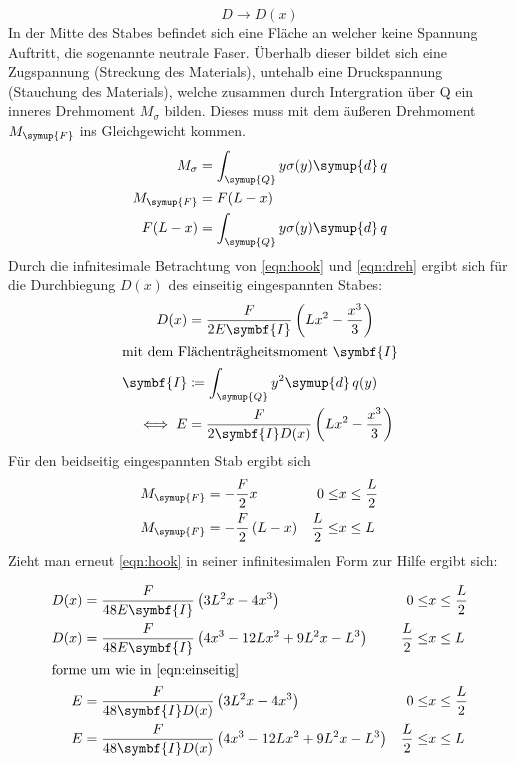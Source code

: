\begin{equation}
  D \to D(x)
\end{equation}
In der Mitte des Stabes befindet sich eine Fläche an welcher
keine Spannung Auftritt, die sogenannte neutrale Faser. Überhalb dieser
bildet sich eine Zugspannung (Streckung des Materials), untehalb eine Druckspannung
(Stauchung des Materials), welche zusammen durch Intergration über Q ein inneres Drehmoment $M_\sigma$ bilden.
Dieses muss mit dem äußeren Drehmoment $M_\symup{F}$ ins Gleichgewicht kommen.
\begin{align}
  M_\sigma &= \int_\symup{Q} y \sigma(y) \symup{d} \, q\\
  M_\symup{F} &= F(L-x)\\
  F(L-x) &= \int_\symup{Q} y \sigma(y) \symup{d} \, q
  \label{eqn:dreh}
\end{align}
Durch die infnitesimale Betrachtung von \eqref{eqn:hook} und \eqref{eqn:dreh} ergibt
sich für die Durchbiegung $D(x)$ des einseitig eingespannten Stabes:
\begin{align}
  D(x) &= \frac{F}{2E\symbf{I}}\left(Lx^2-\frac{x^3}{3}\right)\\
  \intertext{mit dem Flächenträgheitsmoment $\symbf{I}$}
\symbf{I} &\coloneq \int_\symup{Q} y^2 \symup{d}\, q(y)\\
\iff E &= \frac{F}{2\symbf{I}D(x)}\left(Lx^2-\frac{x^3}{3}\right)
\label{eqn:einseitig}
\end{align}
Für den beidseitig eingespannten Stab ergibt sich
\begin{align}
  M_\symup{F} &= -\frac{F}{2}x & 0 \leq &x \leq \frac{L}{2}\\
  M_\symup{F} &= -\frac{F}{2}\left(L-x\right) & \frac{L}{2} \leq &x \leq L\\
\end{align}
Zieht man erneut \eqref{eqn:hook} in seiner infinitesimalen Form zur Hilfe
ergibt sich:

\begin{align}
  D(x) &= \frac{F}{48E\symbf{I}}\left(3L^2x-4x^3\right)& 0 \leq &x \leq \frac{L}{2}\\
  D(x) &= \frac{F}{48E\symbf{I}}\left(4x^3-12Lx^2+9L^2x-L^3\right) & \frac{L}{2} \leq &x \leq L\\
  \intertext{forme um wie in \eqref{eqn:einseitig}}
  E &= \frac{F}{48\symbf{I}D(x)}\left(3L^2x-4x^3\right)& 0 \leq &x \leq \frac{L}{2}
  \label{eqn:beidseitigl}\\
  E &= \frac{F}{48\symbf{I}D(x)}\left(4x^3-12Lx^2+9L^2x-L^3\right) & \frac{L}{2} \leq &x \leq L
  \label{eqn:beidseitigr}
\end{align}
